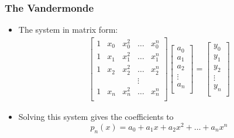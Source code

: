 \documentclass[10pt]{beamer}
\begin{document}
\begin{frame}
\frametitle{The Vandermonde}
\begin{itemize}
    \item The system in matrix form: 
  \begin{align*}
    \begin{bmatrix}
      1 & x_0 & x_0^2 & \dots & x_0^{n}\\
      1 & x_1 & x_1^2 & \dots & x_1^{n}\\
      1 & x_2 & x_2^2 & \dots & x_2^{n}\\
        &     &       & \vdots&      \\
      1 & x_n & x_n^2 & \dots & x_n^{n}\\
    \end{bmatrix}
    \begin{bmatrix}
      a_0\\
      a_1\\
      a_2\\
      \vdots\\
      a_n\\
    \end{bmatrix}
     =
    \begin{bmatrix}
      y_0\\
      y_1\\
      y_2\\
      \vdots\\
      y_n\\
    \end{bmatrix}
  \end{align*}
  \item Solving this system gives the coefficients to 
    \begin{equation*}
    p_n(x) = a_0 + a_1 x + a_2 x^2 +\dots + a_{n} x^{n}
  \end{equation*}
\end{itemize}
\end{frame}
    
\end{document}
